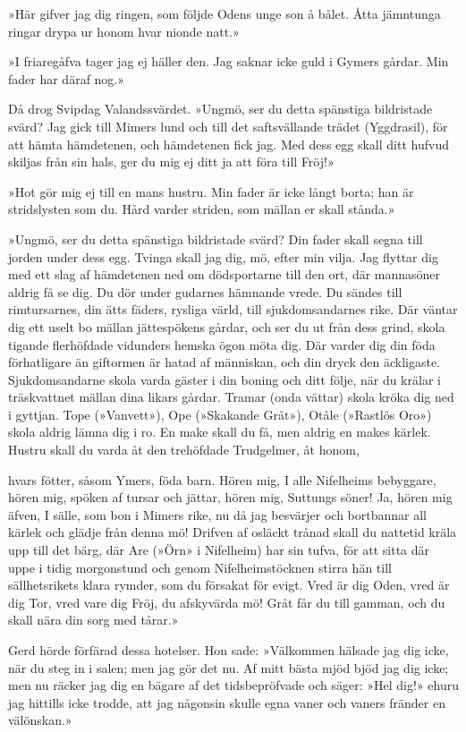 »Här gifver jag dig ringen, som följde Odens unge son å bålet. Åtta
jämntunga ringar drypa ur honom hvar nionde natt.»

»I friaregåfva tager jag ej häller den. Jag saknar icke guld i Gymers
gårdar. Min fader har däraf nog.»

Då drog Svipdag Valandssvärdet. »Ungmö, ser du detta spänstiga
bildristade svärd? Jag gick till Mimers lund och till det saftsvällande
trädet (Yggdrasil), för att hämta hämdetenen, och hämdetenen fick jag.
Med dess egg skall ditt hufvud skiljas från sin hals, ger du mig ej ditt
ja att föra till Fröj!»

»Hot gör mig ej till en mans hustru. Min fader är icke långt borta; han
är stridslysten som du. Hård varder striden, som mällan er skall
stånda.»

»Ungmö, ser du detta spänstiga bildristade svärd? Din fader skall segna
till jorden under dess egg. Tvinga skall jag dig, mö, efter min vilja.
Jag flyttar dig med ett slag af hämdetenen ned om dödsportarne till den
ort, där mannasöner aldrig få se dig. Du dör under gudarnes hämnande
vrede. Du sändes till rimtursarnes, din ätts fäders, rysliga värld, till
sjukdomsandarnes rike. Där väntar dig ett uselt bo mällan jättespökens
gårdar, och ser du ut från dess grind, skola tigande flerhöfdade
vidunders hemska ögon möta dig. Där varder dig din föda förhatligare än
giftormen är hatad af människan, och din dryck den äckligaste.
Sjukdomsandarne skola varda gäster i din boning och ditt följe, när du
krälar i träskvattnet mällan dina likars gårdar. Tramar (onda vättar)
skola kröka dig ned i gyttjan. Tope (»Vanvett»), Ope (»Skakande Gråt»),
Otåle (»Rastlös Oro») skola aldrig lämna dig i ro. En make skall du få,
men aldrig en makes kärlek. Hustru skall du varda åt den trehöfdade
Trudgelmer, åt honom,

hvars fötter, såsom Ymers, föda barn. Hören mig, I alle Nifelheims
bebyggare, hören mig, spöken af tursar och jättar, hören mig, Suttungs
söner! Ja, hören mig äfven, I sälle, som bon i Mimers rike, nu då jag
besvärjer och bortbannar all kärlek och glädje från denna mö! Drifven af
osläckt trånad skall du nattetid kräla upp till det bärg, där Are (»Örn»
i Nifelheim) har sin tufva, för att sitta där uppe i tidig morgonstund
och genom Nifelheimstöcknen stirra hän till sällhetsrikets klara rymder,
som du försakat för evigt. Vred är dig Oden, vred är dig Tor, vred vare
dig Fröj, du afskyvärda mö! Gråt får du till gamman, och du skall nära
din sorg med tårar.»

Gerd hörde förfärad dessa hotelser. Hon sade: »Välkommen hälsade jag dig
icke, när du steg in i salen; men jag gör det nu. Af mitt bästa mjöd
bjöd jag dig icke; men nu räcker jag dig en bägare af det tidsbepröfvade
och säger: »Hel dig!» ehuru jag hittills icke trodde, att jag någonsin
skulle egna vaner och vaners fränder en välönskan.»

